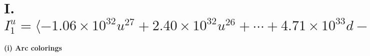 \documentclass[1p]{elsarticle_modified}
\theoremstyle{definition}
\begin{document}
\newpage
\renewcommand{\arraystretch}{1}
\centering \section*{I. $I^u_{1}= \langle -1.06\times10^{32} u^{27}+2.40\times10^{32} u^{26}+\cdots+4.71\times10^{33} d-1.15\times10^{30},\;-7.16\times10^{28} u^{27}+2.11\times10^{32} u^{26}+\cdots+9.42\times10^{33} c+9.51\times10^{33},\;7.44\times10^{31} u^{27}-2.05\times10^{32} u^{26}+\cdots+4.71\times10^{33} b-3.81\times10^{32},\;5.69\times10^{31} u^{27}-1.81\times10^{32} u^{26}+\cdots+1.88\times10^{34} a-1.63\times10^{34},\;u^{28}-3 u^{27}+\cdots-64 u+32 \rangle$}
\flushleft \textbf{(i) Arc colorings}\\
\end{document}

